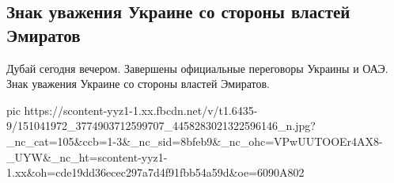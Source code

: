  
 
 
 
 


\subsection{Знак уважения Украине со стороны властей Эмиратов}

Дубай сегодня вечером. Завершены официальные переговоры Украины и ОАЭ.  Знак
уважения Украине со стороны властей Эмиратов.

\ifcmt
  pic https://scontent-yyz1-1.xx.fbcdn.net/v/t1.6435-9/151041972_3774903712599707_4458283021322596146_n.jpg?_nc_cat=105&ccb=1-3&_nc_sid=8bfeb9&_nc_ohc=VPwUUTOOEr4AX8-_UYW&_nc_ht=scontent-yyz1-1.xx&oh=cde19dd36ecec297a7d4f91fbb54a59d&oe=6090A802
\fi

